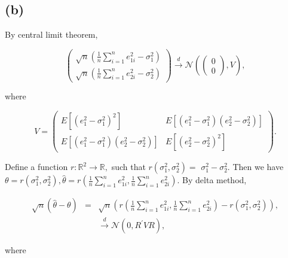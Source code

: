 \documentclass{article}
\begin{document}
\subsection*{(b)}

By central limit theorem,

\begin{equation*}
\left( 
\begin{array}{c}
\sqrt{n}\left( \frac{1}{n}\sum_{i=1}^{n}e_{1i}^{2}-\sigma _{1}^{2}\right) \\ 
\sqrt{n}\left( \frac{1}{n}\sum_{i=1}^{n}e_{2i}^{2}-\sigma _{2}^{2}\right)%
\end{array}%
\right) \overset{d}{\longrightarrow }\mathcal{N}\left( \left( 
\begin{array}{c}
0 \\ 
0%
\end{array}%
\right) ,V\right) ,
\end{equation*}

where

\begin{equation*}
V=\left( 
\begin{array}{cc}
E\left[ \left( e_{1}^{2}-\sigma _{1}^{2}\right) ^{2}\right] & E\left[ \left(
e_{1}^{2}-\sigma _{1}^{2}\right) \left( e_{2}^{2}-\sigma _{2}^{2}\right) %
\right] \\ 
E\left[ \left( e_{1}^{2}-\sigma _{1}^{2}\right) \left( e_{2}^{2}-\sigma
_{2}^{2}\right) \right] & E\left[ \left( e_{2}^{2}-\sigma _{2}^{2}\right)
^{2}\right]%
\end{array}%
\right) .
\end{equation*}

Define a function $r:\mathbb{R}^{2}\rightarrow \mathbb{R},$ such that $%
r\left( \sigma _{1}^{2},\sigma _{2}^{2}\right) =$ $\sigma _{1}^{2}-\sigma
_{2}^{2}.$ Then we have $\theta =r\left( \sigma _{1}^{2},\sigma
_{2}^{2}\right) ,\hat{\theta}=r\left( \frac{1}{n}\sum_{i=1}^{n}e_{1i}^{2},%
\frac{1}{n}\sum_{i=1}^{n}e_{2i}^{2}\right) .$ By delta method,

\begin{eqnarray*}
\sqrt{n}\left( \hat{\theta}-\theta \right)  &=&\sqrt{n}\left( r\left( \frac{1%
}{n}\sum_{i=1}^{n}e_{1i}^{2},\frac{1}{n}\sum_{i=1}^{n}e_{2i}^{2}\right)
-r\left( \sigma _{1}^{2},\sigma _{2}^{2}\right) \right) , \\
&&\overset{d}{\longrightarrow }\mathcal{N}\left( 0,R^{\prime }VR\right) ,
\end{eqnarray*}

where
\end{document}
